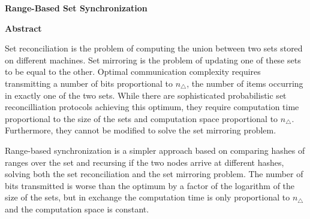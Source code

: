 
\thispagestyle{plain}
\begin{center}
    \Large
    \textbf{Range-Based Set Synchronization}
       
    \vspace{0.9cm}
    \textbf{Abstract}
\end{center}

Set reconciliation is the problem of computing the union between two sets stored on different machines. Set mirroring is the problem of updating one of these sets to be equal to the other. Optimal communication complexity requires transmitting a number of bits proportional to $n_{\triangle}$, the number of items occurring in exactly one of the two sets. While there are sophisticated probabilistic set reconcilliation protocols achieving this optimum, they require computation time proportional to the size of the sets and computation space proportional to $n_{\triangle}$. Furthermore, they cannot be modified to solve the set mirroring problem.

Range-based synchronization is a simpler approach based on comparing hashes of ranges over the set and recursing if the two nodes arrive at different hashes, solving both the set reconciliation and the set mirroring problem. The number of bits transmitted is worse than the optimum by a factor of the logarithm of the size of the sets, but in exchange the computation time is only proportional to $n_{\triangle}$ and the computation space is constant.